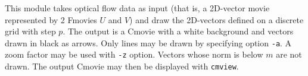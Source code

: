 This module takes optical flow data as input (that is, a 2D-vector 
movie represented by 2 Fmovies $U$ and $V$) and draw the 2D-vectors defined
on a discrete grid with step $p$. The output is a
Cmovie with a white background and vectors drawn in black as arrows.
Only lines may be drawn by specifying option \verb+-a+. 
A zoom factor may be used with \verb+-z+ option.
Vectors whose norm is below $m$ are not drawn.
The output Cmovie may then be displayed with \verb+cmview+.
